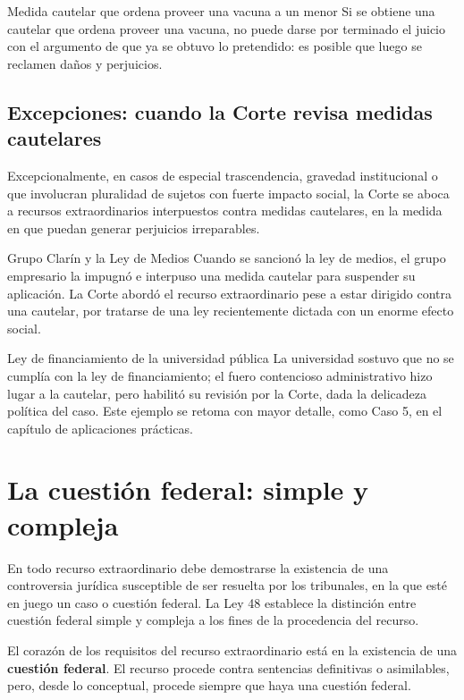 \documentclass[12pt,oneside]{book}
\begin{document}
\begin{example}{Medida cautelar que ordena proveer una vacuna a un menor}
Si se obtiene una cautelar que ordena proveer una vacuna, no puede darse por terminado el juicio con el argumento de que ya se obtuvo lo pretendido: es posible que luego se reclamen daños y perjuicios.
\end{example}

\subsection{Excepciones: cuando la Corte revisa medidas cautelares}

Excepcionalmente, en casos de especial trascendencia, gravedad institucional o que involucran pluralidad de sujetos con fuerte impacto social, la Corte se aboca a recursos extraordinarios interpuestos contra medidas cautelares, en la medida en que puedan generar perjuicios irreparables.

\begin{example}{Grupo Clarín y la Ley de Medios}
Cuando se sancionó la ley de medios, el grupo empresario la impugnó e interpuso una medida cautelar para suspender su aplicación. La Corte abordó el recurso extraordinario pese a estar dirigido contra una cautelar, por tratarse de una ley recientemente dictada con un enorme efecto social.
\end{example}

\begin{example}{Ley de financiamiento de la universidad pública}
La universidad sostuvo que no se cumplía con la ley de financiamiento; el fuero contencioso administrativo hizo lugar a la cautelar, pero habilitó su revisión por la Corte, dada la delicadeza política del caso. Este ejemplo se retoma con mayor detalle, como Caso 5, en el capítulo de aplicaciones prácticas.
\end{example}

\section{La cuestión federal: simple y compleja}

En todo recurso extraordinario debe demostrarse la existencia de una controversia jurídica susceptible de ser resuelta por los tribunales, en la que esté en juego un caso o cuestión federal. La Ley 48 establece la distinción entre cuestión federal simple y compleja a los fines de la procedencia del recurso.

\begin{important}
El corazón de los requisitos del recurso extraordinario está en la existencia de una \textbf{cuestión federal}. El recurso procede contra sentencias definitivas o asimilables, pero, desde lo conceptual, procede siempre que haya una cuestión federal.
\end{important}
\end{document}
